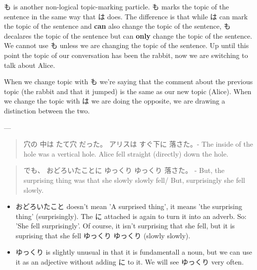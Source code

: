 \documentclass[11pt]{article}
\begin{document}
も is another non-logical topic-marking particle. も marks the topic of the sentence in the same way that は does. The difference is that while は can mark the topic of the sentence and \textbf{can} also change the topic of the sentence, も decalares the topic of the sentence but can \textbf{only} change the topic of the sentence. We cannot use も unless we are changing the topic of the sentence. Up until this point the topic of our conversation has been the rabbit, now we are switching to talk about Alice.

When we change topic with も we're saying that the comment about the previous topic (the rabbit and that it jumped) is the same as our new topic (Alice). When we change the topic with は we are doing the opposite, we are drawing a distinction between the two.

---

\begin{quote}
穴の 中は たて穴 だった。 アリスは すぐ下に 落さた。- The inside of the hole was a vertical hole. Alice fell straight (directly) down the hole.
\end{quote}

\begin{quote}
でも、 おどろいたことに ゆっくり ゆっくり 落さた。 - But, the surprising thing was that she slowly slowly fell/ But, surprisingly she fell slowly.
\end{quote}
\begin{itemize}
\item おどろいたこと doesn't mean 'A surprised thing', it means 'the surprising thing' (surprisingly). The に attached is again to turn it into an adverb. So: 'She fell surprisingly'. Of course, it isn't surprising that she fell, but it is suprising that she fell ゆっくり ゆっくり (slowly slowly).
\item ゆっくり is slightly unusual in that it is fundamentall a noun, but we can use it as an adjective without adding に to it. We will see ゆっくり very often.
\end{itemize}
\end{document}
